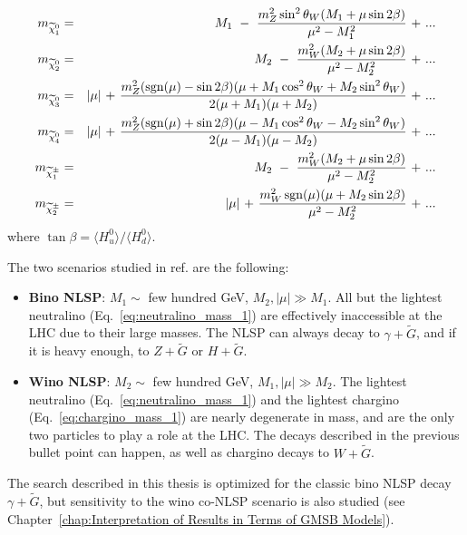 \documentclass[dissertation.tex]{subfiles}
\begin{document}
\begin{eqnarray}
\label{eq:neutralino_mass_1}
m_{\widetilde{\chi}_{1}^{0}} &=& M_{1}\mbox{ }-\mbox{ }\frac{m_{Z}^{2}\sin^{2}\theta_{W}(M_{1} + \mu\sin 2\beta)}{\mu^{2} - M_{1}^{2}}\mbox{ + }...\\
\label{eq:neutralino_mass_2}
m_{\widetilde{\chi}_{2}^{0}} &=& M_{2}\mbox{ }-\mbox{ }\frac{m_{W}^{2}(M_{2} + \mu\sin 2\beta)}{\mu^{2} - M_{2}^{2}}\mbox{ + }...\\
\label{eq:neutralino_mass_3}
m_{\widetilde{\chi}_{3}^{0}} &=& |\mu|\mbox{ + }\frac{m_{Z}^{2}(\operatorname{sgn}(\mu) - \sin 2\beta)(\mu + M_{1}\cos^{2}\theta_{W} + M_{2}\sin^{2}\theta_{W})}{2(\mu + M_{1})(\mu + M_{2})}\mbox{ + }...\\
\label{eq:neutralino_mass_4}
m_{\widetilde{\chi}_{4}^{0}} &=& |\mu|\mbox{ + }\frac{m_{Z}^{2}(\operatorname{sgn}(\mu) + \sin 2\beta)(\mu - M_{1}\cos^{2}\theta_{W} - M_{2}\sin^{2}\theta_{W})}{2(\mu - M_{1})(\mu - M_{2})}\mbox{ + }...\\
\label{eq:chargino_mass_1}
m_{\widetilde{\chi}_{1}^{\pm}} &=& M_{2}\mbox{ }-\mbox{ }\frac{m_{W}^{2}(M_{2} + \mu\sin 2\beta)}{\mu^{2} - M_{2}^{2}}\mbox{ + }...\\
\label{eq:chargino_mass_2}
m_{\widetilde{\chi}_{2}^{\pm}} &=& |\mu|\mbox{ + }\frac{m_{W}^{2}\operatorname{sgn}(\mu)(\mu + M_{2}\sin 2\beta)}{\mu^{2} - M_{2}^{2}}\mbox{ + }...
\end{eqnarray}
%
where $\tan\beta = \langle H_{u}^{0}\rangle/\langle H_{d}^{0}\rangle$.

The two scenarios studied in ref. \cite{CMS_GMSB_1fb-1} are the following:

\begin{itemize}
  \item \textbf{Bino NLSP}: $M_{1} \sim$ few hundred GeV, $M_{2}, |\mu| \gg M_{1}$.  All but the lightest neutralino (Eq.~\ref{eq:neutralino_mass_1}) are effectively inaccessible at the LHC due to their large masses.  The NLSP can always decay to $\gamma + \widetilde{G}$, and if it is heavy enough, to $Z + \widetilde{G}$ or $H + \widetilde{G}$.
  \item \textbf{Wino NLSP}: $M_{2} \sim$ few hundred GeV, $M_{1}, |\mu| \gg M_{2}$.  The lightest neutralino (Eq.~\ref{eq:neutralino_mass_1}) and the lightest chargino (Eq.~\ref{eq:chargino_mass_1}) are nearly degenerate in mass, and are the only two particles to play a role at the LHC.  The decays described in the previous bullet point can happen, as well as chargino decays to $W + \widetilde{G}$.
\end{itemize}
%
The search described in this thesis is optimized for the classic bino NLSP decay $\gamma + \widetilde{G}$, but sensitivity to the wino co-NLSP scenario is also studied (see Chapter~\ref{chap:Interpretation of Results in Terms of GMSB Models}).
\end{document}
